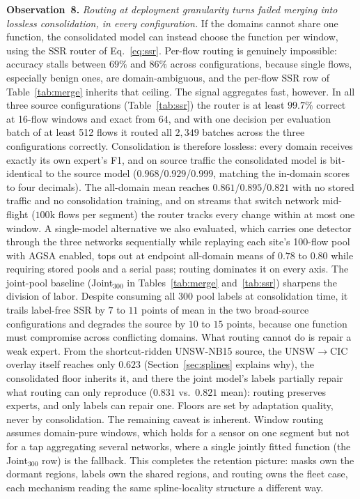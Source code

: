 \documentclass[10pt, conference, letterpaper]{IEEEtran}
\newcommand{\obs}[1]{\vspace{2pt}\noindent\textbf{Observation~#1.}}
\begin{document}
\obs{8} \emph{Routing at deployment granularity turns failed merging
into lossless consolidation, in every configuration.} If the domains
cannot share one function, the consolidated model can instead choose
the function per window, using the SSR router of Eq.~\eqref{eq:ssr}.
Per-flow routing is genuinely impossible: accuracy stalls between
$69\%$ and $86\%$ across configurations, because single flows,
especially benign ones, are domain-ambiguous, and the per-flow SSR row
of Table~\ref{tab:merge} inherits that ceiling. The signal aggregates
fast, however. In all three source configurations
(Table~\ref{tab:ssr}) the router is at least $99.7\%$ correct at
16-flow windows and exact from $64$, and with one decision per
evaluation batch of at least 512 flows it routed all $2{,}349$ batches
across the three configurations correctly. Consolidation is therefore
lossless: every domain receives exactly its own expert's F1, and on
source traffic the consolidated model is bit-identical to the source
model ($0.968$/$0.929$/$0.999$, matching the in-domain scores to four
decimals). The all-domain mean reaches $0.861$/$0.895$/$0.821$ with no
stored traffic and no consolidation training, and on streams that
switch network mid-flight ($100$k flows per segment) the router tracks
every change within at most one window. A single-model alternative we
also evaluated, which carries one detector through the three networks
sequentially while replaying each site's 100-flow pool with AGSA
enabled, tops out at endpoint all-domain means of $0.78$ to $0.80$
while requiring stored pools and a serial pass; routing dominates it
on every axis. The joint-pool baseline (Joint$_{300}$ in
Tables~\ref{tab:merge} and~\ref{tab:ssr}) sharpens the division of
labor. Despite consuming all $300$ pool labels at consolidation time,
it trails label-free SSR by $7$ to $11$ points of mean in the two
broad-source configurations and degrades the source by $10$ to $15$
points, because one function must compromise across conflicting
domains. What routing cannot do is repair a weak expert. From the
shortcut-ridden UNSW-NB15 source, the UNSW$\to$CIC overlay itself
reaches only $0.623$ (Section~\ref{sec:splines} explains why), the
consolidated floor inherits it, and there the joint model's labels
partially repair what routing can only reproduce ($0.831$ vs.\ $0.821$
mean): routing preserves experts, and only labels can repair one.
Floors are set by adaptation quality, never by consolidation. The
remaining caveat is inherent. Window routing assumes domain-pure
windows, which holds for a sensor on one segment but not for a tap
aggregating several networks, where a single jointly fitted function
(the Joint$_{300}$ row) is the fallback. This completes the retention
picture: masks own the dormant regions, labels own the shared regions,
and routing owns the fleet case, each mechanism reading the same
spline-locality structure a different way.
\end{document}
